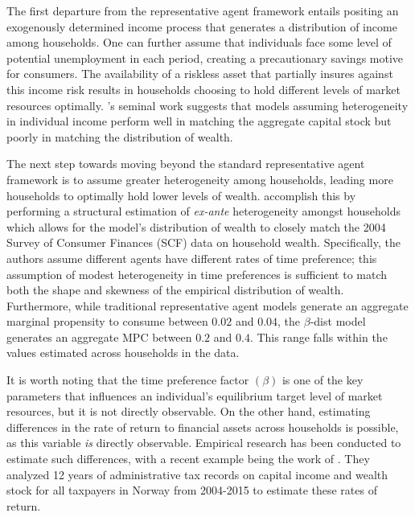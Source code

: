\documentclass[\econtexRoot/Chp1proposal]{subfiles}
\begin{document}
\par The first departure from the representative agent framework entails positing an exogenously determined income process that generates a distribution of income among households. One can further assume that individuals face some level of potential unemployment in each period, creating a precautionary savings motive for consumers. The availability of a riskless asset that partially insures against this income risk results in households choosing to hold different levels of market resources optimally. \cite{ks1998}'s seminal work suggests that models assuming heterogeneity in individual income perform well in matching the aggregate capital stock but poorly in matching the distribution of wealth. 

\par The next step towards moving beyond the standard representative agent framework is to assume greater heterogeneity among households, leading more households to optimally hold lower levels of wealth. \cite{cstw2017} accomplish this by performing a structural estimation of \textit{ex-ante} heterogeneity amongst households which allows for the model's distribution of wealth to closely match the 2004 Survey of Consumer Finances (SCF) data on household wealth. Specifically, the authors assume different agents have different rates of time preference; this assumption of modest heterogeneity in time preferences is sufficient to match both the shape and skewness of the empirical distribution of wealth. Furthermore, while traditional representative agent models generate an aggregate marginal propensity to consume between $0.02$ and $0.04$, the $\beta$-dist model generates an aggregate MPC between $0.2$ and $0.4$. This range falls within the values estimated across households in the data.

\par It is worth noting that the time preference factor $(\beta)$ is one of the key parameters that influences an individual's equilibrium target level of market resources, but it is not directly observable. On the other hand, estimating differences in the rate of return to financial assets across households is possible, as this variable \textit{is} directly observable. Empirical research has been conducted to estimate such differences, with a recent example being the work of \cite{aflgdmlp20}. They analyzed 12 years of administrative tax records on capital income and wealth stock for all taxpayers in Norway from 2004-2015 to estimate these rates of return.
\end{document}

